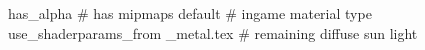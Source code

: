 has_alpha
# has mipmaps
default			 # ingame material type
use_shaderparams_from
_metal.tex		 # remaining diffuse sun light



